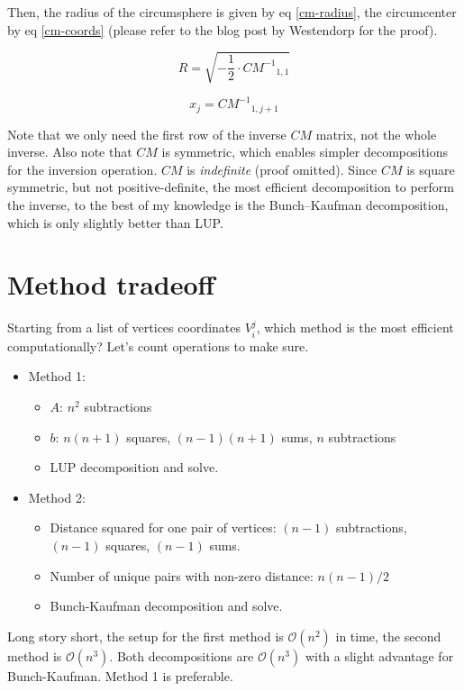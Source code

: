 \documentclass[]{article}
\begin{document}
Then, the radius of the circumsphere is given by eq \ref{cm-radius}, the
circumcenter by eq \ref{cm-coords} (please refer to the blog post by Westendorp
for the proof).

\begin{equation} \label{cm-radius}
R = \sqrt{- \frac{1}{2} \cdot {CM^{-1}}_{1,1}}
\end{equation}

\begin{equation} \label{cm-coords}
x_j = {CM^{-1}}_{1,j+1}
\end{equation}

Note that we only need the first row of the inverse $CM$ matrix, not the whole
inverse. Also note that $CM$ is symmetric, which enables simpler decompositions
for the inversion operation. $CM$ is \emph{indefinite} (proof omitted).
Since $CM$ is square symmetric, but not positive-definite, the most efficient
decomposition to perform the inverse, to the best of my knowledge is the
Bunch–Kaufman decomposition, which is only slightly better than LUP.

\section{Method tradeoff}
Starting from a list of vertices coordinates $V_i^j$, which method is the most
efficient computationally? Let's count operations to make sure.

\begin{itemize}
\item Method 1: \begin{itemize}
\item $A$: $n^2$ subtractions
\item $b$: $n(n+1)$ squares, $(n-1)(n+1)$ sums, $n$ subtractions
\item LUP decomposition and solve.
\end{itemize}
\item Method 2: \begin{itemize}
\item Distance squared for one pair of vertices: $(n-1)$ subtractions, $(n-1)$
      squares, $(n-1)$ sums.
\item Number of unique pairs with non-zero distance: $n(n-1)/2$
\item Bunch-Kaufman decomposition and solve.
\end{itemize} \end{itemize}

Long story short, the setup for the first method is $\mathcal{O}(n^2)$ in time,
the second method is $\mathcal{O}(n^3)$. Both decompositions are
$\mathcal{O}(n^3)$ with a slight advantage for Bunch-Kaufman. Method 1 is
preferable.
\end{document}
